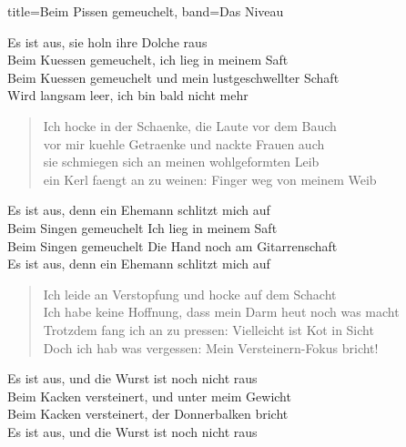 \begin{song}{title=Beim Pissen gemeuchelt, band=Das Niveau}
        \begin{chorus}
            Es ist aus, sie holn ihre Dolche raus \\
            Beim Kuessen gemeuchelt, ich lieg in meinem Saft \\
            Beim Kuessen gemeuchelt und mein lustgeschwellter Schaft \\
            Wird langsam leer, ich bin bald nicht mehr
        \end{chorus}

        \begin{verse}
            Ich hocke in der Schaenke, die Laute vor dem Bauch \\
            vor mir kuehle Getraenke und nackte Frauen auch \\
            sie schmiegen sich an meinen wohlgeformten Leib \\
            ein Kerl faengt an zu weinen: Finger weg von meinem Weib
        \end{verse}

        \begin{chorus}
            Es ist aus, denn ein Ehemann schlitzt mich auf \\
            Beim Singen gemeuchelt Ich lieg in meinem Saft \\
            Beim Singen gemeuchelt Die Hand noch am Gitarrenschaft \\
            Es ist aus, denn ein Ehemann schlitzt mich auf
        \end{chorus}

        \begin{verse}
            Ich leide an Verstopfung und hocke auf dem Schacht \\
            Ich habe keine Hoffnung, dass mein Darm heut noch was macht \\
            Trotzdem fang ich an zu pressen: Vielleicht ist Kot in Sicht \\
            Doch ich hab was vergessen: Mein Versteinern-Fokus bricht!
        \end{verse}

        \begin{chorus}
            Es ist aus, und die Wurst ist noch nicht raus \\
            Beim Kacken versteinert, und unter meim Gewicht \\
            Beim Kacken versteinert, der Donnerbalken bricht \\
            Es ist aus, und die Wurst ist noch nicht raus
        \end{chorus}
\end{song}